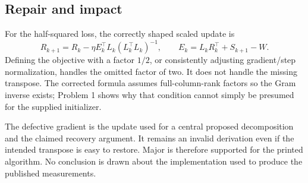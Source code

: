 \documentclass[10pt]{article}
\begin{document}
\subsection*{Repair and impact}
For the half-squared loss, the correctly shaped scaled update is \[R_{k+1}=R_k-\eta E_k^\top L_k(L_k^\top L_k)^{-1},
\qquad E_k=L_kR_k^\top+S_{k+1}-W.\] Defining the objective with a factor \(1/2\), or consistently adjusting gradient/step normalization, handles the omitted factor of two. It does not handle the missing transpose. The corrected formula assumes full-column-rank factors so the Gram inverse exists; Problem 1 shows why that condition cannot simply be presumed for the supplied initializer.\par
The defective gradient is the update used for a central proposed decomposition and the claimed recovery argument. It remains an invalid derivation even if the intended transpose is easy to restore. Major is therefore supported for the printed algorithm. No conclusion is drawn about the implementation used to produce the published measurements.\par
\end{document}

